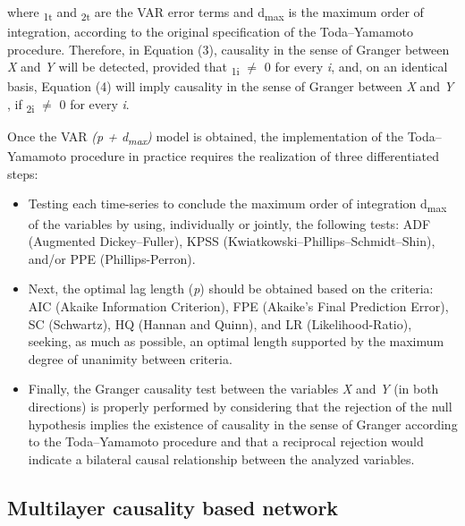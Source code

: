 \documentclass{article}
\begin{document}
where \textomega\textsubscript{1t} and \textomega\textsubscript{2t} are the VAR error terms and d\textsubscript{max} is the maximum order of integration, according to
the original specification of the Toda–Yamamoto procedure. Therefore, in Equation (3), causality
in the sense of Granger between \textit{X} and \textit{Y} will be detected, provided that \textdelta\textsubscript{1i}  $\neq$ 0 for every \textit{i}, and, on an
identical basis, Equation (4) will imply causality in the sense of Granger between \textit{X} and \textit{Y} , if \textdelta\textsubscript{2i}  $\neq$ 0 for every \textit{i}.

Once the VAR \textit{(p + d\textsubscript{max})}  model is obtained, the implementation of the Toda–Yamamoto procedure in practice requires the realization of three differentiated steps: 

\begin{itemize}
\item Testing each time-series to conclude the maximum order of integration d\textsubscript{max} of
the variables by using, individually or jointly, the following tests: ADF (Augmented Dickey–Fuller), KPSS (Kwiatkowski–Phillips–Schmidt–Shin), and/or PPE (Phillips-Perron). 

\item Next, the optimal lag length (\textit{p}) should be obtained based on the criteria: AIC (Akaike Information Criterion), FPE (Akaike’s Final Prediction Error), SC (Schwartz), HQ (Hannan and Quinn), and LR
(Likelihood-Ratio), seeking, as much as possible, an optimal length supported by the maximum degree of unanimity between criteria. 

\item Finally, the Granger causality test between the variables \textit{X} and \textit{Y} (in both directions) is properly performed by considering that the rejection of the null hypothesis implies
the existence of causality in the sense of Granger according to the Toda–Yamamoto procedure and that a reciprocal rejection would indicate a bilateral causal relationship between the analyzed variables.
\end{itemize}

\subsection{Multilayer causality based network}
\end{document}
